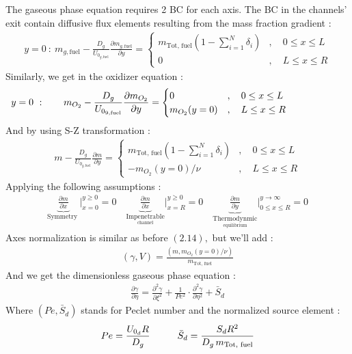 \documentclass[12pt]{article}
\newcommand\tab[1][1cm]{\hspace*{#1}}
\numberwithin{equation}{section}
\begin{document}
\begin{flushleft}
The gaseous phase equation requires 2 BC for each axis. The {BC} in the channels' exit contain diffusive flux elements resulting from the mass fraction gradient :
\begin{align} 
y=0 \ : \ m_{g, \text{fuel}}-\frac{D_{g}}{U_{0_{g,  \text{fuel}}}} \frac{\partial m_{g,{\text{fuel}}}}{\partial y}= \begin{cases}
m_{\text{Tot, fuel}}\left(1-\sum_{i=1}^{N} \delta_{i}\right) & , \quad 0 \leq x \leq L \\
0 & , \quad L \leq x \leq R
\end{cases}
\end{align}
Similarly, we get in the oxidizer equation :
\begin{align} 
y=0 \ :  \hspace{7mm} m_{O_{2}}-\frac{D_{g}}{U_{0_{9,\text{fuel}}} } \frac{\partial m_{O_{2}}}{\partial y}=\begin{cases}
0 & , \quad 0 \leq x \leq L \\
m_{O_{2}}(y=0) & , \quad L \leq x \leq R
\end{cases}  \hspace{21mm}
\end{align}
And by using S-Z transformation :
\begin{align} 
m-\frac{D_{g}}{U_{0_{g,\text{fuel}}}} \frac{\partial m}{\partial y}= \begin{cases}
m_{ \text{Tot, fuel}}\left(1-\sum_{i=1}^{N} \delta_{i}\right) & , \quad 0 \leq x \leq L \\
-m_{O_{2}}(y=0) / \nu & , \quad L \leq x \leq R 
\end{cases}
\end{align} 
Applying the following assumptions :
\begin{align} 
\underbrace{\frac{\partial m}{\partial x}}_{\text {Symmetry }}\bigg|_{x=0} ^{y \geq 0}=0 \quad \underbrace{\frac{\partial m}{\partial x}}_{  \underset{\text {channel}}{\text{Impenetrable}}} \bigg|_{x=R} ^{y \geq 0}= 0 \quad \underbrace{\frac{\partial m}{\partial y}}_{  \underset{\text {equilibrium}}{\text{Thermodynmic}}} \bigg|_{0 \leq x \leq R} ^{y \rightarrow \infty}=0
\end{align} 
Axes normalization is similar as before $(2.14),$ but we'll add :
\begin{align} 
(\gamma, V)=\frac{\left(m, m_{O_{2}}(y=0) / \nu\right)}{m_{\text{Tot, fuel}}}
\end{align} 
And we get the dimensionless gaseous phase equation :
\begin{align} 
\frac{\partial \gamma}{\partial \eta}=\frac{\partial^{2} \gamma}{\partial \xi^{2}}+\frac{1}{P e^{2}} \cdot \frac{\partial^{2} \gamma}{\partial \eta^{2}}+\bar{S}_{d}
\end{align} 
Where $\left(P e, \bar{S}_{d}\right)$ stands for Peclet number and the normalized source element :
\begin{align} 
P e=\frac{U_{0_{d}} R}{D_{g}} \tab \bar{S}_{d}=\frac{S_{d} R^{2}}{D_{g}\, m_{ \text{Tot, fuel}}}
\end{align} 


\end{flushleft}
\end{document}

